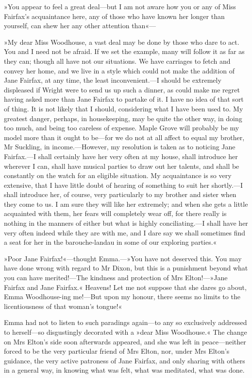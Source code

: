 »You appear to feel a great deal—but I am not aware how you or any of Miss Fairfax's acquaintance here, any of those who have known her longer than yourself, can shew her any other attention than«—

»My dear Miss Woodhouse, a vast deal may be done by those who dare to act. You and I need not be afraid. If we set the example, many will follow it as far as they can; though all have not our situations. We have carriages to fetch and convey her home, and we live in a style which could not make the addition of Jane Fairfax, at any time, the least inconvenient.—I should be extremely displeased if Wright were to send us up such a dinner, as could make me regret having asked more than Jane Fairfax to partake of it. I have no idea of that sort of thing. It is not likely that I should, considering what I have been used to. My greatest danger, perhaps, in housekeeping, may be quite the other way, in doing too much, and being too careless of expense. Maple Grove will probably be my model more than it ought to be—for we do not at all affect to equal my brother, Mr Suckling, in income.—However, my resolution is taken as to noticing Jane Fairfax.—I shall certainly have her very often at my house, shall introduce her wherever I can, shall have musical parties to draw out her talents, and shall be constantly on the watch for an eligible situation. My acquaintance is so very extensive, that I have little doubt of hearing of something to suit her shortly.—I shall introduce her, of course, very particularly to my brother and sister when they come to us. I am sure they will like her extremely; and when she gets a little acquainted with them, her fears will completely wear off, for there really is nothing in the manners of either but what is highly conciliating.—I shall have her very often indeed while they are with me, and I dare say we shall sometimes find a seat for her in the barouche-landau in some of our exploring parties.«

»Poor Jane Fairfax!«—thought Emma.—»You have not deserved this. You may have done wrong with regard to Mr Dixon, but this is a punishment beyond what you can have merited!—The kindness and protection of Mrs Elton!—»Jane Fairfax and Jane Fairfax.« Heavens! Let me not suppose that she dares go about, Emma Woodhouse-ing me!—But upon my honour, there seems no limits to the licentiousness of that woman's tongue!«

Emma had not to listen to such paradings again—to any so exclusively addressed to herself—so disgustingly decorated with a »dear Miss Woodhouse.« The change on Mrs Elton's side soon afterwards appeared, and she was left in peace—neither forced to be the very particular friend of Mrs Elton, nor, under Mrs Elton's guidance, the very active patroness of Jane Fairfax, and only sharing with others in a general way, in knowing what was felt, what was meditated, what was done.

